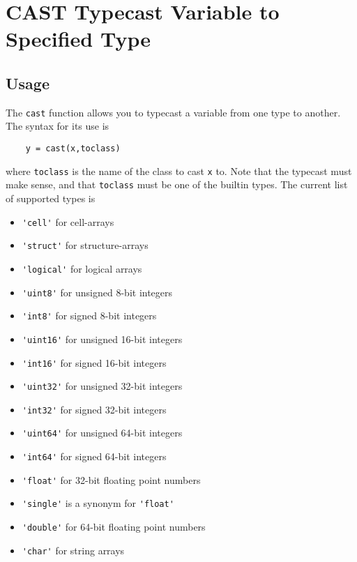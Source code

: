 \section{CAST Typecast Variable to Specified Type}

\subsection{Usage}

The \verb|cast| function allows you to typecast a variable from one
type to another.  The syntax for its use is 
\begin{verbatim}
    y = cast(x,toclass)
\end{verbatim}
where \verb|toclass| is the name of the class to cast \verb|x| to.  Note
that the typecast must make sense, and that \verb|toclass| must be
one of the builtin types.  The current list of supported types is
\begin{itemize}
\item  \verb|'cell'| for cell-arrays

\item  \verb|'struct'| for structure-arrays

\item  \verb|'logical'| for logical arrays

\item  \verb|'uint8'| for unsigned 8-bit integers

\item  \verb|'int8'| for signed 8-bit integers

\item  \verb|'uint16'| for unsigned 16-bit integers

\item  \verb|'int16'| for signed 16-bit integers

\item  \verb|'uint32'| for unsigned 32-bit integers

\item  \verb|'int32'| for signed 32-bit integers

\item  \verb|'uint64'| for unsigned 64-bit integers

\item  \verb|'int64'| for signed 64-bit integers

\item  \verb|'float'| for 32-bit floating point numbers

\item  \verb|'single'| is a synonym for \verb|'float'|

\item  \verb|'double'| for 64-bit floating point numbers

\item  \verb|'char'| for string arrays

\end{itemize}
